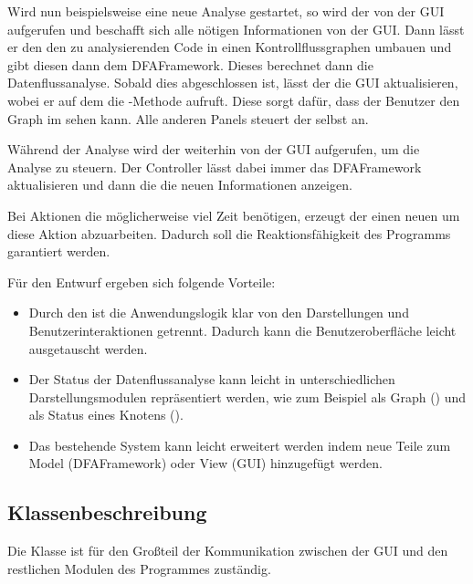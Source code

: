 Wird nun beispielsweise eine neue Analyse gestartet, so wird der  von der GUI aufgerufen und beschafft sich alle nötigen Informationen von der GUI.
Dann lässt er den  den zu analysierenden Code in einen Kontrollflussgraphen umbauen und gibt diesen dann dem DFAFramework. Dieses berechnet dann die Datenflussanalyse.
Sobald dies abgeschlossen ist, lässt der  die GUI aktualisieren, wobei er auf dem  die -Methode aufruft.
Diese sorgt dafür, dass der Benutzer den Graph im  sehen kann. Alle anderen Panels steuert der  selbst an.

Während der Analyse wird der  weiterhin von der GUI aufgerufen, um die Analyse zu steuern. Der Controller lässt dabei immer das DFAFramework aktualisieren und dann die  die neuen Informationen anzeigen.

Bei Aktionen die möglicherweise viel Zeit benötigen, erzeugt der  einen neuen  um diese Aktion abzuarbeiten.
Dadurch soll die Reaktionsfähigkeit des Programms garantiert werden.

Für den Entwurf ergeben sich folgende Vorteile:
\begin{itemize}
	\item Durch den  ist die Anwendungslogik klar von den Darstellungen und Benutzerinteraktionen getrennt.
	Dadurch kann die Benutzeroberfläche leicht ausgetauscht werden.
	\item Der Status der Datenflussanalyse kann leicht in unterschiedlichen Darstellungsmodulen repräsentiert werden, wie zum Beispiel als Graph () und als Status eines Knotens ().
	\item Das bestehende System kann leicht erweitert werden indem neue Teile zum Model (DFAFramework) oder View (GUI) hinzugefügt werden.
\end{itemize}

\subsection{Klassenbeschreibung}


Die Klasse  ist für den Großteil der Kommunikation zwischen der GUI und den restlichen Modulen des Programmes zuständig.

